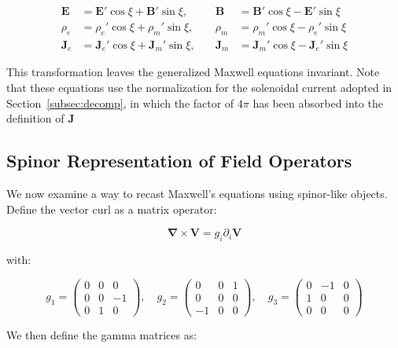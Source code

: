 \documentclass {article}
\renewcommand\vec{\mathbf}
\let\OldS\nabla
\renewcommand{\nabla}{\boldsymbol{\OldS}}
\begin{document}
\begin{equation}
\begin{aligned}
\vec{E} &= \vec{E}' \cos \xi + \vec{B}' \sin \xi, \quad
&\vec{B} &= \vec{B}' \cos \xi - \vec{E}' \sin \xi \\
\rho_e &= \rho_e' \cos \xi + \rho_m' \sin \xi, \quad
&\rho_m &= \rho_m' \cos \xi - \rho_e' \sin \xi \\
\vec{J}_e &= \vec{J}_e' \cos \xi + \vec{J}_m' \sin \xi, \quad
&\vec{J}_m &= \vec{J}_m' \cos \xi - \vec{J}_e' \sin \xi
\end{aligned}
\end{equation}

This transformation leaves the generalized Maxwell equations invariant. Note that these equations use the normalization for the solenoidal current adopted in Section~\ref{subsec:decomp}, in which the factor of  \(4 \pi\) has been absorbed into the definition of \(\vec{J}\)




\subsection{Spinor Representation of Field Operators}

We now examine a way to recast Maxwell's equations using spinor-like objects. Define the vector curl as a matrix operator:

\begin{equation}
\nabla \times \vec{V} = g_i \partial_i \vec{V}
\end{equation}

with:

\begin{equation}
g_1 = \begin{pmatrix}
0 & 0 & 0 \\
0 & 0 & -1 \\
0 & 1 & 0
\end{pmatrix}, \quad
g_2 = \begin{pmatrix}
0 & 0 & 1 \\
0 & 0 & 0 \\
-1 & 0 & 0
\end{pmatrix}, \quad
g_3 = \begin{pmatrix}
0 & -1 & 0 \\
1 & 0 & 0 \\
0 & 0 & 0
\end{pmatrix}
\end{equation}


We then define the gamma matrices as:
\end{document}
